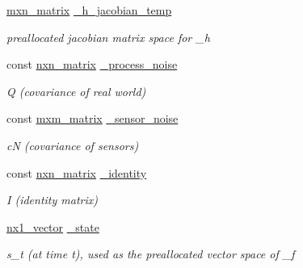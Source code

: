 \begin{DoxyCompactItemize}
\hyperlink{classkafi_1_1kafi_aff7caef22091a9df5285ecf70dad2388}{mxn\+\_\+matrix} \hyperlink{classkafi_1_1kafi_a058866cbcc97c123ebd9ec2378e32b2c}{\+\_\+h\+\_\+jacobian\+\_\+temp}
\begin{DoxyCompactList}\small\item\em preallocated jacobian matrix space for {\ttfamily \+\_\+h} \end{DoxyCompactList}\item 
\mbox{\label{classkafi_1_1kafi_a4d62565c0dfe71e5d432c0cd04a66136}} 
const \hyperlink{classkafi_1_1kafi_a771d8045a61e16033e4a644675b5f4e7}{nxn\+\_\+matrix} \hyperlink{classkafi_1_1kafi_a4d62565c0dfe71e5d432c0cd04a66136}{\+\_\+process\+\_\+noise}
\begin{DoxyCompactList}\small\item\em {\ttfamily Q} (covariance of real world) \end{DoxyCompactList}\item 
\mbox{\label{classkafi_1_1kafi_a79675f9b45665189a44430e93667d696}} 
const \hyperlink{classkafi_1_1kafi_af3ca34ea0c57e9054e4c2d51fc7e5971}{mxm\+\_\+matrix} \hyperlink{classkafi_1_1kafi_a79675f9b45665189a44430e93667d696}{\+\_\+sensor\+\_\+noise}
\begin{DoxyCompactList}\small\item\em {\ttfamily cN} (covariance of sensors) \end{DoxyCompactList}\item 
\mbox{\label{classkafi_1_1kafi_a79036f08f420e6de9c11dada4e4b67f6}} 
const \hyperlink{classkafi_1_1kafi_a771d8045a61e16033e4a644675b5f4e7}{nxn\+\_\+matrix} \hyperlink{classkafi_1_1kafi_a79036f08f420e6de9c11dada4e4b67f6}{\+\_\+identity}
\begin{DoxyCompactList}\small\item\em {\ttfamily I} (identity matrix) \end{DoxyCompactList}\item 
\mbox{\label{classkafi_1_1kafi_a83457abd1caed518a3c162b873f8e39c}} 
\hyperlink{classkafi_1_1kafi_a47144ae2efe936ede222eced035a6e46}{nx1\+\_\+vector} \hyperlink{classkafi_1_1kafi_a83457abd1caed518a3c162b873f8e39c}{\+\_\+state}
\begin{DoxyCompactList}\small\item\em {\ttfamily s\+\_\+t} (at time {\ttfamily t}), used as the preallocated vector space of {\ttfamily \+\_\+f} \end{DoxyCompactList}\item 

\end{DoxyCompactItemize}
